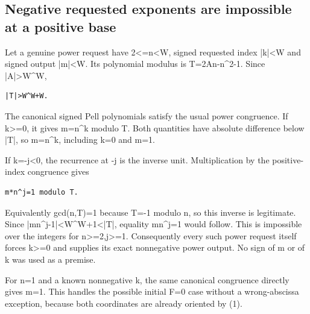 \subsection{Negative requested exponents are impossible at a positive base}



Let a genuine power request have 2\textless{}\allowbreak{}=\allowbreak{}n\textless{}\allowbreak{}W, signed requested index |k|\textless{}\allowbreak{}W and signed output |m|\textless{}\allowbreak{}W. Its polynomial modulus is T=\allowbreak{}2An-n\textasciicircum{}\allowbreak{}2-1. Since |A|\textgreater{}\allowbreak{}W\textasciicircum{}\allowbreak{}W,



\begin{verbatim}
|T|>W^W+W.
\end{verbatim}

The canonical signed Pell polynomials satisfy the usual power congruence. If k\textgreater{}\allowbreak{}=\allowbreak{}0, it gives m=\allowbreak{}n\textasciicircum{}\allowbreak{}k modulo T. Both quantities have absolute difference below |T|, so m=\allowbreak{}n\textasciicircum{}\allowbreak{}k, including k=\allowbreak{}0 and m=\allowbreak{}1.



If k=\allowbreak{}-j\textless{}\allowbreak{}0, the recurrence at -j is the inverse unit. Multiplication by the positive-index congruence gives



\begin{verbatim}
m*n^j=1 modulo T.
\end{verbatim}

Equivalently gcd(n,T)=\allowbreak{}1 because T=\allowbreak{}-1 modulo n, so this inverse is legitimate. Since |m\textasteriskcentered{}\allowbreak{}n\textasciicircum{}\allowbreak{}j-1|\textless{}\allowbreak{}W\textasciicircum{}\allowbreak{}W+\allowbreak{}1\textless{}\allowbreak{}|T|, equality m\textasteriskcentered{}\allowbreak{}n\textasciicircum{}\allowbreak{}j=\allowbreak{}1 would follow. This is impossible over the integers for n\textgreater{}\allowbreak{}=\allowbreak{}2,j\textgreater{}\allowbreak{}=\allowbreak{}1. Consequently every such power request itself forces k\textgreater{}\allowbreak{}=\allowbreak{}0 and supplies its exact nonnegative power output. No sign of m or of k was used as a premise.



For n=\allowbreak{}1 and a known nonnegative k, the same canonical congruence directly gives m=\allowbreak{}1. This handles the possible initial F=\allowbreak{}0 case without a wrong-abscissa exception, because both coordinates are already oriented by (1).



